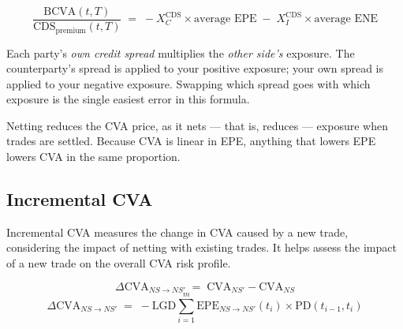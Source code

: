 \begin{crfmlbox}
\[ \frac{\mathrm{BCVA}(t,T)}{\mathrm{CDS}_{\text{premium}}(t,T)}
   \;=\; -X^{\mathrm{CDS}}_{C}\times \text{average EPE}
   \;-\; X^{\mathrm{CDS}}_{I}\times \text{average ENE} \]
\end{crfmlbox}

\begin{crkeybox}
Each party's \emph{own credit spread} multiplies the \emph{other side's}
exposure. The counterparty's spread is applied to your positive exposure; your own
spread is applied to your negative exposure. Swapping which spread goes with which
exposure is the single easiest error in this formula.
\end{crkeybox}


Netting reduces the CVA price, as it nets --- that is, reduces --- exposure when
trades are settled. Because CVA is linear in EPE, anything that lowers EPE lowers
CVA in the same proportion.


\subsection*{Incremental CVA}

Incremental CVA measures the change in CVA caused by a new trade, considering the
impact of netting with existing trades. It helps assess the impact of a new trade
on the overall CVA risk profile.

\begin{crfmlbox}
\[ \Delta\mathrm{CVA}_{NS \to NS'} \;=\; \mathrm{CVA}_{NS'} - \mathrm{CVA}_{NS} \]
\[ \Delta\mathrm{CVA}_{NS \to NS'} \;=\; -\mathrm{LGD}\sum_{i=1}^{m}
   \mathrm{EPE}_{NS \to NS'}(t_i)\times \mathrm{PD}(t_{i-1},t_i) \]
\end{crfmlbox}

